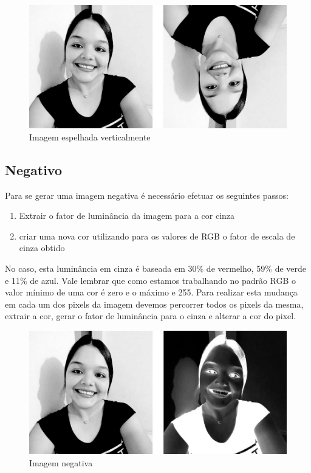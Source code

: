 		\begin{figure}[!htb]
			\centering
			\includegraphics[width=\textwidth]{img/06-espelho2.jpg}
			\caption{Imagem espelhada verticalmente}
		\end{figure}
		
		\lstset{language=c++}
		{\tiny }
		
	\subsection{Negativo}
		Para se gerar uma imagem negativa é necessário efetuar os seguintes passos:
		
		\begin{enumerate}
			\item Extrair o fator de luminância da imagem para a cor cinza
			\item criar uma nova cor utilizando para os valores de RGB o fator de escala de cinza obtido
		\end{enumerate}

		No caso, esta luminância em cinza é baseada em 30\% de vermelho, 59\% de verde e 11\% de azul. Vale lembrar que como estamos trabalhando no padrão RGB o valor mínimo de uma cor é zero e o máximo e 255. Para realizar esta mudança em cada um dos pixels da imagem devemos percorrer todos os pixels da mesma, extrair a cor, gerar o fator de luminância para o cinza e alterar a cor do pixel.

		\begin{figure}[!htb]
			\centering
			\includegraphics[width=\textwidth]{img/07-negativo.jpg}
			\caption{Imagem negativa}
		\end{figure}
		
